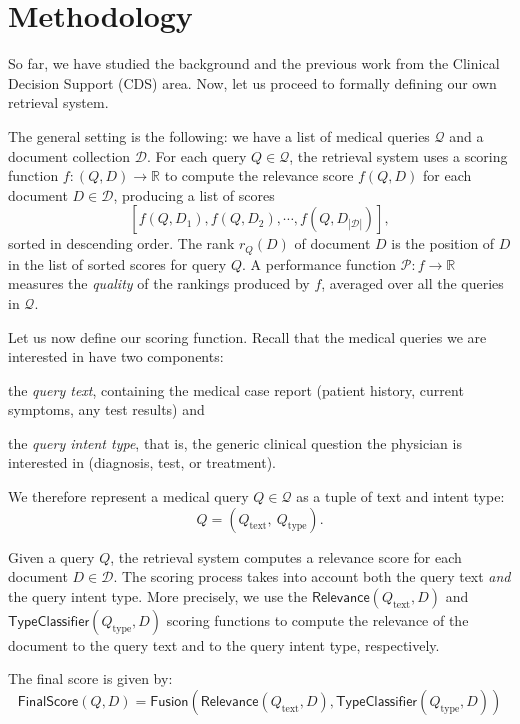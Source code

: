 \chapter{Methodology}\label{meth}

So far, we have studied the background and the previous work from the Clinical Decision Support (CDS) area.
Now, let us proceed to formally defining our own retrieval system.

The general setting is the following: we have a list of medical queries $\mathcal{Q}$ and a document collection $\mathcal{D}$.
For each query $Q \in \mathcal{Q}$,
the retrieval system uses a scoring function $f:(Q,D)\rightarrow\mathbb{R}$ to compute the relevance score $f(Q,D)$
for each
document $D\in\mathcal{D}$, producing a list of scores \[[f(Q,D_1), f(Q,D_2), \cdots, f(Q,D_{|\mathcal{D}|})],\]
sorted in descending order.
The rank $r_Q(D)$ of document $D$ is the position of $D$ in the list of sorted scores for query $Q$.
A performance function $\mathcal{P}:f\rightarrow\mathbb{R}$ measures the \emph{quality} of the rankings produced by
$f$, averaged over all the queries in $ \mathcal{Q}$.

Let us now define our scoring function.
Recall that the medical queries we are interested in have two components:
\begin{enumerate*}[label=\arabic*)]
 \item the \emph{query text}, containing the medical case report (patient history, current symptoms, any test results) and
 \item the \emph{query intent type}, that is, the generic clinical question the physician is interested in (diagnosis, test, or treatment).
\end{enumerate*}
We therefore represent a medical query $Q\in\mathcal{Q}$ as a tuple of text and intent type: \[Q = \left(Q_{\text{text}},\ Q_{\text{type}}\right).\]

Given a query $Q$, the retrieval system computes a relevance score for each document $D\in\mathcal{D}$.
The scoring process takes into account both the query text \emph{and} the query intent type.
More precisely, we use the
$\textsf{Relevance}(Q_{\text{text}}, D)$ and $\textsf{TypeClassifier}(Q_{\text{type}}, D)$
scoring functions to compute the relevance of the document to the query text and to the query intent type, respectively.

The final score is given by:
\begin{equation}\label{fusion}
  \textsf{FinalScore}(Q, D) = \textsf{Fusion}\left(\textsf{Relevance}(Q_{\text{text}}, D), \textsf{TypeClassifier}(Q_{\text{type}}, D)\right)
\end{equation}

